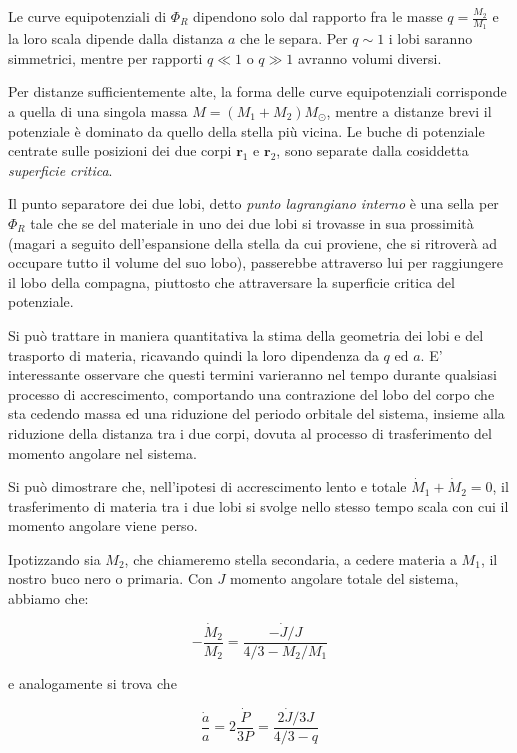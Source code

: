 \documentclass[a4paperbi]{article}
\begin{document}
	Le curve equipotenziali di $\Phi_R$ dipendono solo dal rapporto fra le masse $q=\frac{M_2}{M_1}$ e la loro scala dipende dalla distanza $a$ che le separa. Per $q\sim1$ i lobi saranno simmetrici, mentre per rapporti $q\ll1$ o $q\gg1$ avranno volumi diversi.
	
	Per distanze sufficientemente alte, la forma delle curve equipotenziali corrisponde a quella di una singola massa $M=(M_1+M_2)M_\odot$, mentre a distanze brevi il potenziale è dominato da quello della stella più vicina. Le buche di potenziale centrate sulle posizioni dei due corpi $\textbf{r}_1$ e $\textbf{r}_2$, sono separate dalla cosiddetta \textit{superficie critica}.
	
	Il punto separatore dei due lobi, detto \textit{punto lagrangiano interno} è una sella per $\Phi_R$ tale che se del materiale in uno dei due lobi si trovasse in sua prossimità (magari a seguito dell'espansione della stella da cui proviene, che si ritroverà ad occupare tutto il volume del suo lobo), passerebbe attraverso lui per raggiungere il lobo della compagna, piuttosto che attraversare la superficie critica del potenziale.
	
	Si può trattare in maniera quantitativa la stima della geometria dei lobi e del trasporto di materia, ricavando quindi la loro dipendenza da $q$ ed $a$. E' interessante osservare che questi termini varieranno nel tempo durante qualsiasi processo di accrescimento, comportando una contrazione del lobo del corpo che sta cedendo massa ed una riduzione del periodo orbitale del sistema, insieme alla riduzione della distanza tra i due corpi, dovuta al processo di trasferimento del momento angolare nel sistema.
	
	Si può dimostrare che, nell'ipotesi di accrescimento lento e totale $\dot{M}_1+\dot{M}_2=0$, il trasferimento di materia tra i due lobi si svolge nello stesso tempo scala con cui il momento angolare viene perso.
	
	Ipotizzando sia $M_2$, che chiameremo stella secondaria, a cedere materia a $M_1$, il nostro buco nero o primaria. Con $J$ momento angolare totale del sistema, abbiamo che:
	
	\begin{equation}
		-\frac{\dot{M}_2}{M_2}=\frac{-\dot{J}/J}{4/3-M_2/M_1}
	\end{equation}
	
	e analogamente si trova che

	\begin{equation}
		\frac{\dot{a}}{a}=2\frac{\dot{P}}{3P}=\frac{2\dot{J}/3J}{4/3-q}
	\end{equation}
	
\end{document}
